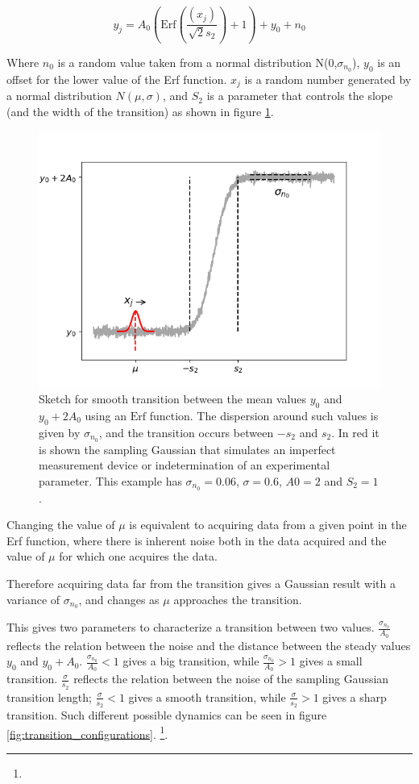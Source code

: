 \begin{equation}
	y_j=A_0\left(\mathrm{ Erf} \left( \frac{(x_j)}{\sqrt{2}s_2}\right)+1\right)+y_0+n_0
\end{equation}

Where $n_0$ is a random value taken from a normal distribution N(0,$\sigma_{n_0}$), $y_0$ is an offset for the lower value of the Erf function. 
$x_j$ is a random number generated by a normal distribution $N(\mu,\sigma)$, and $S_2$ is  a parameter that controls the slope (and the width of the transition) as shown in figure \ref{fig:transition_example}. 

\begin{figure}[htb]
	\centering
	\includegraphics[width=0.7\linewidth]{Images/Metrics/erf_example.png}
	\caption{ Sketch for smooth transition between the mean values $y_0$ and $y_0+2A_0$ using an $\mathrm{Erf}$ function. The dispersion around such values is given by $\sigma_{n_0}$, and the transition occurs between $-s_2$ and $s_2$.
		In red it is shown the sampling Gaussian that simulates an imperfect measurement device or indetermination of an experimental parameter. 
		This example has $\sigma_{n_0}=0.06$, $\sigma=0.6$, $A0=2$ and  $S_2=1$.}
	\label{fig:transition_example}
\end{figure}
Changing the value of $\mu$ is equivalent to acquiring data from a given point in the Erf function, where there is inherent  noise both in the data acquired and the value of $\mu$ for which one acquires the data. 

Therefore acquiring data far from the transition gives a Gaussian result with a variance of $\sigma_{n_0}$, and changes as $\mu$ approaches the transition. 

This gives two parameters to characterize a transition between two values.
$\frac{\sigma_{n_0}}{A_0}$ reflects the relation between the noise and the distance between the steady values $y_0$ and $y_0+A_0$. 
$\frac{\sigma_{n_0}}{A_0}<1$ gives a big transition, while $\frac{\sigma_{n_0}}{A_0}>1$ gives a small transition. $\frac{\sigma}{s_2}$ reflects the relation between the noise of the sampling Gaussian transition length; $\frac{\sigma}{s_2}<1$ gives a smooth transition, while $\frac{\sigma}{s_2}>1$ gives a sharp transition. Such different possible dynamics can be seen in figure \ref{fig:transition_configurations}.
\footnote{}.


